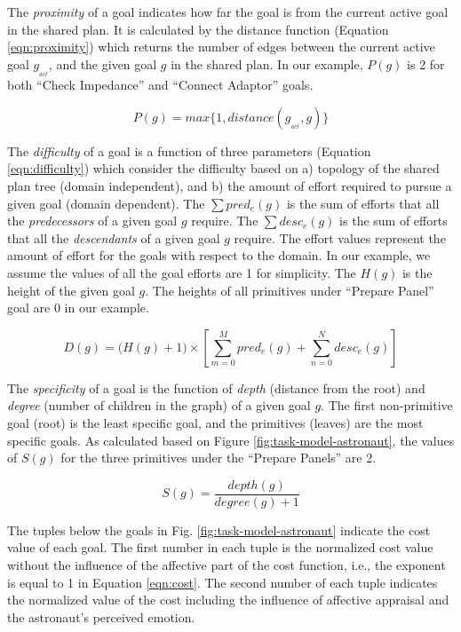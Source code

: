 \documentclass[12pt]{report}
\begin{document}
The \textit{proximity} of a goal indicates how far the goal is from the current
active goal in the shared plan. It is calculated by the distance function
(Equation \ref{eqn:proximity}) which returns the number of edges between the
current active goal $g_{_{act}}$, and the given goal $g$ in the shared plan. In
our example, $P(g)$ is 2 for both ``Check Impedance'' and ``Connect Adaptor''
goals.

\begin{equation}
P(g) = max\big\{1, distance(g_{_{act}},g)\big\}
\label{eqn:proximity}
\end{equation}

The \textit{difficulty} of a goal is a function of three parameters (Equation
\ref{eqn:difficulty}) which consider the difficulty based on a) topology of the
shared plan tree (domain independent), and b) the amount of effort required to
pursue a given goal (domain dependent). The $\sum pred_e(g)$ is the sum of
efforts that all the \textit{predecessors} of a given goal $g$ require. The
$\sum desc_e(g)$ is the sum of efforts that all the \textit{descendants} of a
given goal $g$ require. The effort values represent the amount of effort for the
goals with respect to the domain. In our example, we assume the values of all
the goal efforts are 1 for simplicity. The $H(g)$ is the height of the given
goal $g$. The heights of all primitives under ``Prepare Panel'' goal are 0 in
our example.

\begin{equation}
D(g) = \Big(H(g)+1\Big)\times\left[\sum\limits_{m=0}^{M} pred_e(g) +
\sum\limits_{n=0}^{N} desc_e(g)\right]
\label{eqn:difficulty}
\end{equation}

The \textit{specificity} of a goal is the function of \textit{depth} (distance
from the root) and \textit{degree} (number of children in the graph) of a given
goal $g$. The first non-primitive goal (root) is the least specific goal, and
the primitives (leaves) are the most specific goals. As calculated based on
Figure \ref{fig:task-model-astronaut}, the values of $S(g)$ for the three
primitives under the ``Prepare Panels'' are 2.

\begin{equation}
S(g) = \frac{depth(g)}{degree(g)+1}
\label{eqn:specificity}
\end{equation}

The tuples below the goals in Fig. \ref{fig:task-model-astronaut} indicate the
cost value of each goal. The first number in each tuple is the normalized cost
value without the influence of the affective part of the cost function, i.e.,
the exponent is equal to 1 in Equation \ref{eqn:cost}. The second number of each
tuple indicates the normalized value of the cost including the influence of
affective appraisal and the astronaut's perceived emotion.
\end{document}
